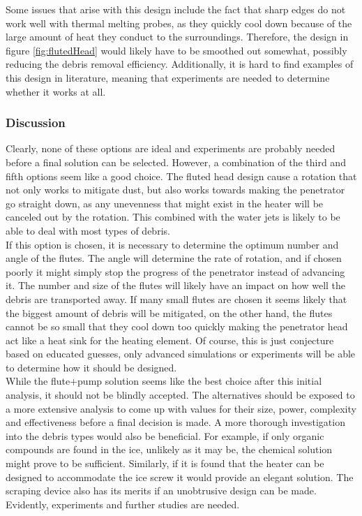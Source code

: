 \noindent
Some issues that arise with this design include the fact that sharp edges do not work well with thermal melting probes, as they quickly cool down because of the large amount of heat they conduct to the surroundings. Therefore, the design in figure \ref{fig:flutedHead} would likely have to be smoothed out somewhat, possibly reducing the debris removal efficiency. Additionally, it is hard to find examples of this design in literature, meaning that experiments are needed to determine whether it works at all. \\

\subsubsection{Discussion}
Clearly, none of these options are ideal and experiments are probably needed before a final solution can be selected. However, a combination of the third and fifth options seem like a good choice. The fluted head design cause a rotation that not only works to mitigate dust, but also works towards making the penetrator go straight down, as any unevenness that might exist in the heater will be canceled out by the rotation. This combined with the water jets is likely to be able to deal with most types of debris. \\

\noindent
If this option is chosen, it is necessary to determine the optimum number and angle of the flutes. The angle will determine the rate of rotation, and if chosen poorly it might simply stop the progress of the penetrator instead of advancing it. The number and size of the flutes will likely have an impact on how well the debris are transported away. If many small flutes are chosen it seems likely that the biggest amount of debris will be mitigated, on the other hand, the flutes cannot be so small that they cool down too quickly making the penetrator head act like a heat sink for the heating element. Of course, this is just conjecture based on educated guesses, only advanced simulations or experiments will be able to determine how it should be designed.\\

\noindent
While the flute+pump solution seems like the best choice after this initial analysis, it should not be blindly accepted. The alternatives should be exposed to a more extensive analysis to come up with values for their size, power, complexity and effectiveness before a final decision is made. A more thorough investigation into the debris types would also be beneficial. For example, if only organic compounds are found in the ice, unlikely as it may be, the chemical solution might prove to be sufficient. Similarly, if it is found that the heater can be designed to accommodate the ice screw it would provide an elegant solution. The scraping device also has its merits if an unobtrusive design can be made.\\

\noindent
Evidently, experiments and further studies are needed.   







